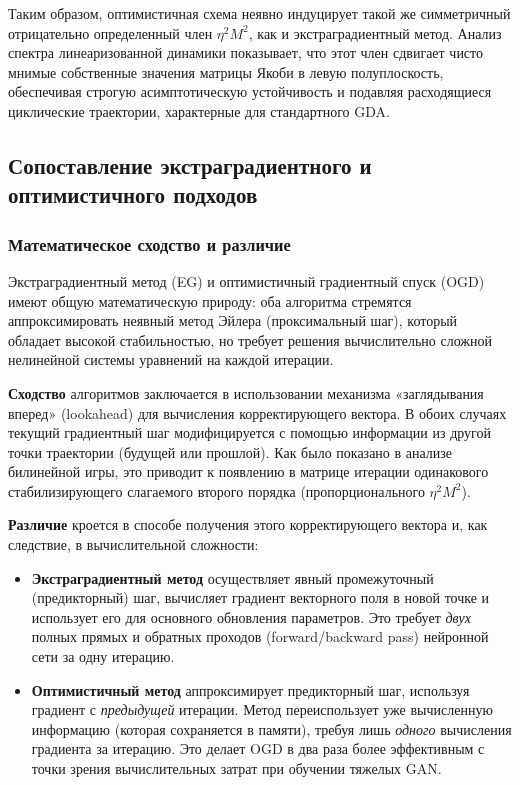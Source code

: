 \documentclass[12pt,a4paper]{article}
\begin{document}
	Таким образом, оптимистичная схема неявно индуцирует такой же симметричный отрицательно определенный член $\eta^2 M^2$, как и экстраградиентный метод. Анализ спектра линеаризованной динамики показывает, что этот член сдвигает чисто мнимые собственные значения матрицы Якоби в левую полуплоскость, обеспечивая строгую асимптотическую устойчивость и подавляя расходящиеся циклические траектории, характерные для стандартного GDA.
	
	\subsection{Сопоставление экстраградиентного и оптимистичного подходов}
	
	\subsubsection{Математическое сходство и различие}
	Экстраградиентный метод (EG) и оптимистичный градиентный спуск (OGD) имеют общую математическую природу: оба алгоритма стремятся аппроксимировать неявный метод Эйлера (проксимальный шаг), который обладает высокой стабильностью, но требует решения вычислительно сложной нелинейной системы уравнений на каждой итерации.
	
	\textbf{Сходство} алгоритмов заключается в использовании механизма «заглядывания вперед» (lookahead) для вычисления корректирующего вектора. В обоих случаях текущий градиентный шаг модифицируется с помощью информации из другой точки траектории (будущей или прошлой). Как было показано в анализе билинейной игры, это приводит к появлению в матрице итерации одинакового стабилизирующего слагаемого второго порядка (пропорционального $\eta^2 M^2$).
	
	\textbf{Различие} кроется в способе получения этого корректирующего вектора и, как следствие, в вычислительной сложности:
	\begin{itemize}
		\item \textbf{Экстраградиентный метод} осуществляет явный промежуточный (предикторный) шаг, вычисляет градиент векторного поля в новой точке и использует его для основного обновления параметров. Это требует \textit{двух} полных прямых и обратных проходов (forward/backward pass) нейронной сети за одну итерацию.
		\item \textbf{Оптимистичный метод} аппроксимирует предикторный шаг, используя градиент с \textit{предыдущей} итерации. Метод переиспользует уже вычисленную информацию (которая сохраняется в памяти), требуя лишь \textit{одного} вычисления градиента за итерацию. Это делает OGD в два раза более эффективным с точки зрения вычислительных затрат при обучении тяжелых GAN.
	\end{itemize}
	
\end{document}
